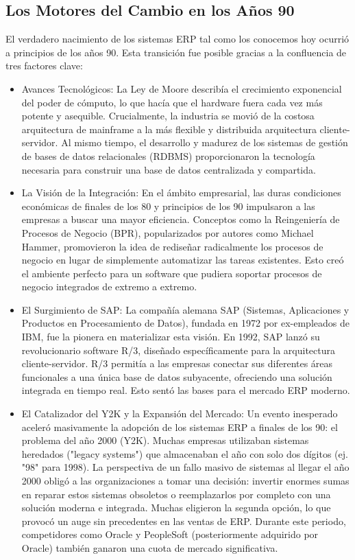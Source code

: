 \documentclass[12pt,letterpaper,spanish]{report}
\begin{document}
\subsection{Los Motores del Cambio en los Años 90}
El verdadero nacimiento de los sistemas ERP tal como los conocemos hoy ocurrió a principios de los años 90. Esta transición fue posible gracias a la confluencia de tres factores clave:

\begin{itemize}
  \item Avances Tecnológicos: La Ley de Moore describía el crecimiento exponencial del poder de cómputo, lo que hacía que el hardware fuera cada vez más potente y asequible. Crucialmente, la industria se movió de la costosa arquitectura de mainframe a la más flexible y distribuida arquitectura cliente-servidor. Al mismo tiempo, el desarrollo y madurez de los sistemas de gestión de bases de datos relacionales (RDBMS) proporcionaron la tecnología necesaria para construir una base de datos centralizada y compartida.
  \item La Visión de la Integración: En el ámbito empresarial, las duras condiciones económicas de finales de los 80 y principios de los 90 impulsaron a las empresas a buscar una mayor eficiencia. Conceptos como la Reingeniería de Procesos de Negocio (BPR), popularizados por autores como Michael Hammer, promovieron la idea de rediseñar radicalmente los procesos de negocio en lugar de simplemente automatizar las tareas existentes. Esto creó el ambiente perfecto para un software que pudiera soportar procesos de negocio integrados de extremo a extremo.
  \item El Surgimiento de SAP: La compañía alemana SAP (Sistemas, Aplicaciones y Productos en Procesamiento de Datos), fundada en 1972 por ex-empleados de IBM, fue la pionera en materializar esta visión. En 1992, SAP lanzó su revolucionario software R/3, diseñado específicamente para la arquitectura cliente-servidor. R/3 permitía a las empresas conectar sus diferentes áreas funcionales a una única base de datos subyacente, ofreciendo una solución integrada en tiempo real. Esto sentó las bases para el mercado ERP moderno.
  \item El Catalizador del Y2K y la Expansión del Mercado:
Un evento inesperado aceleró masivamente la adopción de los sistemas ERP a finales de los 90: el problema del año 2000 (Y2K). Muchas empresas utilizaban sistemas heredados ("legacy systems") que almacenaban el año con solo dos dígitos (ej. "98" para 1998). La perspectiva de un fallo masivo de sistemas al llegar el año 2000 obligó a las organizaciones a tomar una decisión: invertir enormes sumas en reparar estos sistemas obsoletos o reemplazarlos por completo con una solución moderna e integrada. Muchas eligieron la segunda opción, lo que provocó un auge sin precedentes en las ventas de ERP. Durante este periodo, competidores como Oracle y PeopleSoft (posteriormente adquirido por Oracle) también ganaron una cuota de mercado significativa.
\end{itemize}
\end{document}
